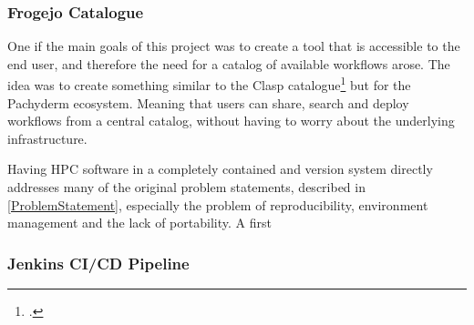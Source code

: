 \subsubsection{Frogejo Catalogue}

One if the main goals of this project was to create a tool that is accessible to the end user,
and therefore the need for a catalog of available workflows arose.
The idea was to create something similar to the Clasp catalogue\footcite{sayersCLoudApplicationServices2015} but for the Pachyderm ecosystem.
Meaning that users can share, search and deploy workflows from a central catalog, without having to worry about the underlying infrastructure.

Having \ac{HPC} software in a completely contained and version system directly addresses many of the original problem statements,
described in \ref{ProblemStatement}, especially the problem of reproducibility, environment management and the lack of portability.
A first 

\subsubsection{Jenkins CI/CD Pipeline}
